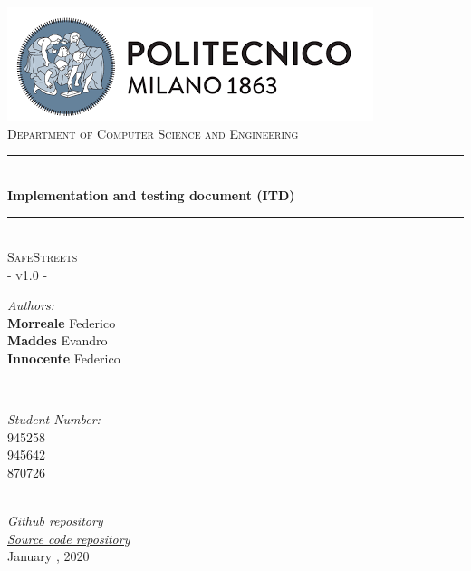 \documentclass[a4paper, hidelinks, 12pt]{report}
\begin{document}
    \begin{titlepage}
        \centering
        \vspace*{0.7 cm}
        \includegraphics[scale = 0.85]{assets/polimi.png}\\[1.6 cm]
        \textsc{\large Department of Computer Science and Engineering}\\[1.8 cm]

        \rule{\linewidth}{0.2 mm} \\[0.4 cm]
        { \huge \bfseries Implementation and testing document (ITD)}\\
        \rule{\linewidth}{0.2 mm} \\[1.5 cm]

        \textsc{\Large SafeStreets}\\[0.5 cm]
        \textsc{\large - v1.0 -}\\[1 cm]

        \begin{minipage}{0.4\textwidth}
            \begin{flushleft}
                \large
                \emph{Authors:}\\
                \textbf{Morreale} Federico \\
                \textbf{Maddes} Evandro \\
                \textbf{Innocente} Federico
            \end{flushleft}
        \end{minipage}~
        \begin{minipage}{0.4\textwidth}
            \begin{flushright}
                \large
                \emph{Student Number:} \\
                945258 \\
                945642 \\
                870726
            \end{flushright}
        \end{minipage}\\[2 cm]

        {
        \href{https://github.com/fedy97/MorrealeMaddesInnocente}{\emph{Github repository}}
        }\\
        {
        \href{https://github.com/fedy97/MorrealeMaddesInnocente/tree/master/safe_streets}{\emph{Source code repository}}
        }\\[1 cm]
        {\large January  , 2020}\\[2 cm]

        \vfill
    \end{titlepage}
\end{document}

